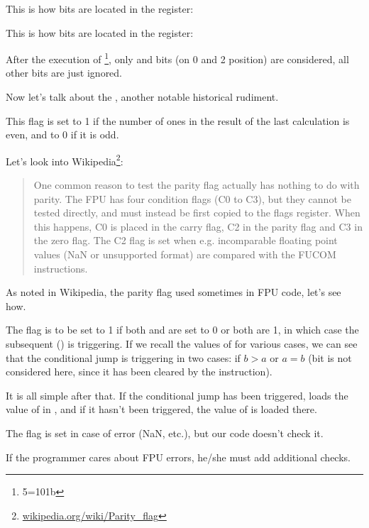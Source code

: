 This is how \CThreeBits bits are located in the \AX register:



This is how \CThreeBits bits are located in the \AH register:



After the execution of \footnote{5=101b}, 
only \Czero and \Ctwo bits (on 0 and 2 position) are considered, all other bits are just
ignored.

\label{parity_flag}

Now let's talk about the , another notable historical rudiment.

This flag is set to 1 if the number of ones in the result of the last calculation is even, and to 0 if it is odd.

Let's look into Wikipedia\footnote{\href{http://go.yurichev.com/17131}{wikipedia.org/wiki/Parity\_flag}}:

\begin{framed}
\begin{quotation}
One common reason to test the parity flag actually has nothing to do with parity. The FPU has four condition flags 
(C0 to C3), but they cannot be tested directly, and must instead be first copied to the flags register. 
When this happens, C0 is placed in the carry flag, C2 in the parity flag and C3 in the zero flag. 
The C2 flag is set when e.g. incomparable floating point values (NaN or unsupported format) are compared 
with the FUCOM instructions.
\end{quotation}
\end{framed}

As noted in Wikipedia, the parity flag used sometimes in FPU code, let's see how.


The \PF flag is to be set to 1 if both \Czero and \Ctwo are set to 0 or both are 1, in which case
the subsequent \JP () is triggering. 
If we recall the values of \CThreeBits for various cases,
we can see that the conditional jump 
\JP is triggering in two cases: if $b>a$ or $a=b$ 
(\Cthree bit is not considered here, since it has been cleared by the  instruction).

It is all simple after that. 
If the conditional jump has been triggered, 
\FLD loads the value of  
in , and if it hasn't been triggered, the value of  is loaded there.


The \Ctwo flag is set in case of error (\gls{NaN}, etc.), but our code doesn't check it.

If the programmer cares about FPU errors, he/she must add additional checks.


